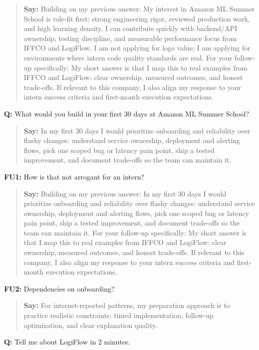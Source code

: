 \documentclass[9pt,a4paper]{article}
\begin{document}
\begin{quote}\small\textbf{Say:} Building on my previous answer: My interest in Amazon ML Summer School is role-fit first: strong engineering rigor, reviewed production work, and high learning density. I can contribute quickly with backend/API ownership, testing discipline, and measurable performance focus from IFFCO and LogiFlow. I am not applying for logo value; I am applying for environments where intern code quality standards are real. For your follow-up specifically: My short answer is that I map this to real examples from IFFCO and LogiFlow: clear ownership, measured outcomes, and honest trade-offs. If relevant to this company, I also align my response to your intern success criteria and first-month execution expectations.\end{quote}
\vspace{2mm}
\textbf{Q:} What would you build in your first 30 days at Amazon ML Summer School?

\begin{quote}\small\textbf{Say:} In my first 30 days I would prioritize onboarding and reliability over flashy changes: understand service ownership, deployment and alerting flows, pick one scoped bug or latency pain point, ship a tested improvement, and document trade-offs so the team can maintain it.\end{quote}
\vspace{2mm}
\textbf{FU1:} How is that not arrogant for an intern?

\begin{quote}\small\textbf{Say:} Building on my previous answer: In my first 30 days I would prioritize onboarding and reliability over flashy changes: understand service ownership, deployment and alerting flows, pick one scoped bug or latency pain point, ship a tested improvement, and document trade-offs so the team can maintain it. For your follow-up specifically: My short answer is that I map this to real examples from IFFCO and LogiFlow: clear ownership, measured outcomes, and honest trade-offs. If relevant to this company, I also align my response to your intern success criteria and first-month execution expectations.\end{quote}
\vspace{2mm}
\textbf{FU2:} Dependencies on onboarding?

\begin{quote}\small\textbf{Say:} For internet-reported patterns, my preparation approach is to practice realistic constraints: timed implementation, follow-up optimization, and clear explanation quality.\end{quote}
\vspace{2mm}
\textbf{Q:} Tell me about LogiFlow in 2 minutes.
\end{document}
